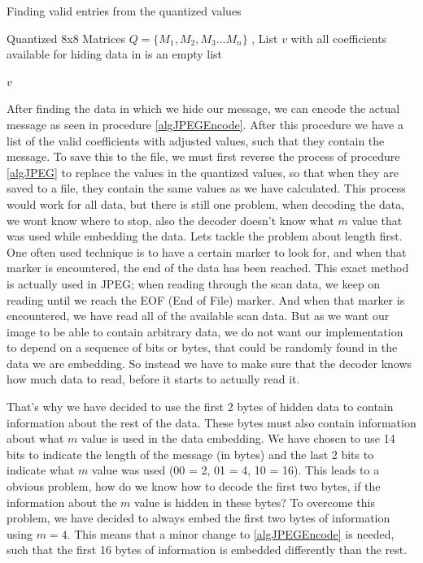 \begin{algorithm}
\caption{Finding valid entries from the quantized values}
\label{algJPEG}
\begin{algorithmic}
\REQUIRE Quantized 8x8 Matrices $Q = \{ M_1, M_2, M_3 \ldots M_n \}$ ,
\ENSURE List $v$ with all coefficients available for hiding data in
 is an empty list

			\ENDIF
		\ENDFOR
	\ENDFOR
\ENDFOR

\RETURN $v$
\end{algorithmic}
\end{algorithm}

After finding the data in which we hide our message, we can encode the actual message as seen in procedure \ref{algJPEGEncode}. After this procedure we have a list of the valid coefficients with adjusted values, such that they contain the message. To save this to the file, we must first reverse the process of procedure \ref{algJPEG} to replace the values in the quantized values, so that when they are saved to a file, they contain the same values as we have calculated. This process would work for all data, but there is still one problem, when decoding the data, we wont know where to stop, also the decoder doesn't know what $m$ value that was used while embedding the data. Lets tackle the problem about length first. One often used technique is to have a certain marker to look for, and when that marker is encountered, the end of the data has been reached. This exact method is actually used in JPEG; when reading through the scan data, we keep on reading until we reach the EOF (End of File) marker. And when that marker is encountered, we have read all of the available scan data. But as we want our image to be able to contain arbitrary data, we do not want our implementation to depend on a sequence of bits or bytes, that could be randomly found in the data we are embedding. So instead we have to make sure that the decoder knows how much data to read, before it starts to actually read it. 

That's why we have decided to use the first 2 bytes of hidden data to contain information about the rest of the data. These bytes must also contain information about what $m$ value is used in the data embedding. We have chosen to use 14 bits to indicate the length of the message (in bytes) and the last 2 bits to indicate what $m$ value was used (00 = 2, 01 = 4, 10 = 16). This leads to a obvious problem, how do we know how to decode the first two bytes, if the information about the $m$ value is hidden in these bytes? To overcome this problem, we have decided to always embed the first two bytes of information using $m = 4$. This means that a minor change to \ref{algJPEGEncode} is needed, such that the first 16 bytes of information is embedded differently than the rest.


